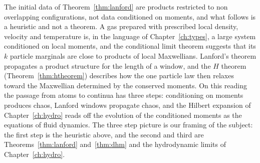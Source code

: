 The initial data of Theorem~\ref{thm:lanford} are products restricted to non overlapping configurations, not data conditioned on moments, and what follows is a heuristic and not a theorem. A gas prepared with prescribed local density, velocity and temperature is, in the language of Chapter~\ref{ch:types}, a large system conditioned on local moments, and the conditional limit theorem suggests that its $k$ particle marginals are close to products of local Maxwellians. Lanford's theorem propagates a product structure for the length of a window, and the $H$ theorem (Theorem~\ref{thm:htheorem}) describes how the one particle law then relaxes toward the Maxwellian determined by the conserved moments. On this reading the passage from atoms to continua has three steps: conditioning on moments produces chaos, Lanford windows propagate chaos, and the Hilbert expansion of Chapter~\ref{ch:hydro} reads off the evolution of the conditioned moments as the equations of fluid dynamics. The three step picture is our framing of the subject: the first step is the heuristic above, and the second and third are Theorems~\ref{thm:lanford} and~\ref{thm:dhm} and the hydrodynamic limits of Chapter~\ref{ch:hydro}.
